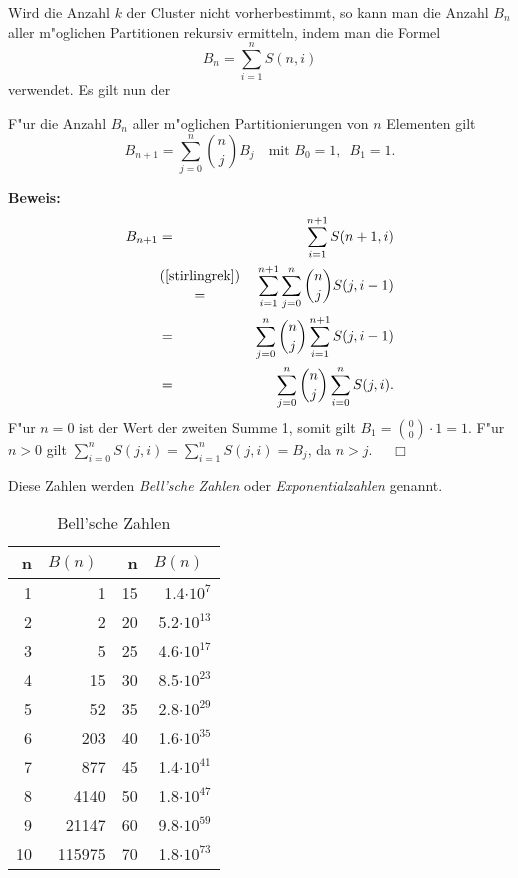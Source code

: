 Wird die Anzahl $k$ der Cluster nicht vorherbestimmt, so kann man die 
Anzahl $B_n$ aller m"oglichen Partitionen rekursiv ermitteln, indem
man die Formel
\[ B_n = \sum_{i=1}^n S(n, i)\]
verwendet. Es gilt nun der 

\begin{satz}
F"ur die Anzahl $B_{n}$ aller m"oglichen Partitionierungen von $n$ 
Elementen gilt
\[ B_{n+1} = \sum_{j=0}^n {n \choose j} B_j \quad \mbox{mit } 
	B_0 = 1,\enspace B_1 = 1. \]
\end{satz}
{\bf Beweis: }
\begin{eqnarray*}
	B_{n+1} & = & \sum_{i=1}^{n+1} S(n+1,i) \\
		& {(\ref{stirlingrek}) \atop =} & \sum_{i=1}^{n+1}
			\sum_{j=0}^n {n \choose j} S(j,i-1) \\
		& = & \sum_{j=0}^n {n \choose j} \sum_{i=1}^{n+1} S(j,i-1) \\
		& = & \sum_{j=0}^n {n \choose j} \sum_{i=0}^n S(j,i). \\
\end{eqnarray*}
F"ur $n=0$ ist der Wert der zweiten Summe 1,
somit gilt $B_1 = { 0 \choose 0} \cdot 1 = 1$. 
F"ur $n > 0$ gilt $\sum_{i=0}^n S(j,i) = \sum_{i=1}^n S(j,i) = B_j$,
da $n > j$.
$\quad\Box$
\vspace*{0.5cm}

Diese Zahlen werden {\em Bell'sche Zahlen} oder {\em Exponentialzahlen}
genannt.

\begin{table}[htbp]
\caption{Bell'sche Zahlen}
\begin{center}
\begin{tabular}{|r|r||r|r|}\hline
	n & $B(n)\enspace$ & n &  $B(n)\enspace$  \\
	\hline
	1 & 1 & 15 & 1.4$\cdot 10^{7}$ \\
	2 & 2 & 20 & 5.2$\cdot 10^{13}$ \\
	3 & 5 & 25 & 4.6$\cdot 10^{17}$ \\
	4 & 15 & 30 & 8.5$\cdot 10^{23}$ \\
	5 & 52 & 35 & 2.8$\cdot 10^{29}$ \\
	6 & 203 & 40 & 1.6$\cdot 10^{35}$ \\
	7 & 877 & 45 & 1.4$\cdot 10^{41}$ \\
	8 & 4140 & 50 & 1.8$\cdot 10^{47}$ \\
	9 & 21147 & 60 & 9.8$\cdot 10^{59}$ \\
	10 & 115975 & 70 & 1.8$\cdot 10^{73}$ \\
	\hline
\end{tabular}\\
\end{center}
\end{table}

